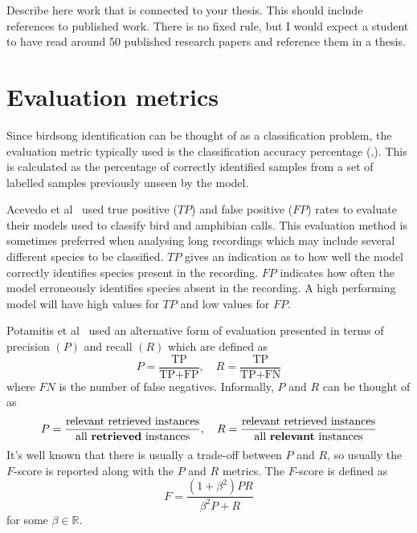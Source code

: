 Describe here work that is connected to your thesis. This should include
references to published work. There is no fixed rule, but I would expect a
student to have read around 50 published research papers and reference them in a
thesis.

\section{Evaluation metrics}

Since birdsong identification can be thought of as a classification problem, the
evaluation metric typically used is the classification accuracy percentage 
(\cite{ramashini2019bird},).
This is calculated as the percentage of correctly identified samples from a set
of labelled samples previously unseen by the model.

Acevedo et al~\cite{acevedo2009automated} used true positive ($TP$) and false
positive ($FP$) rates to evaluate their models used to classify bird and amphibian
calls. This evaluation method is sometimes preferred when analysing long
recordings which may include several different species to be classified. $TP$
gives an indication as to how well the model correctly identifies species
present in the recording. $FP$ indicates how often the model erroneously
identifies species absent in the recording. A high performing model will have
high values for $TP$ and low values for $FP$\@.

Potamitis et al~\cite{potamitis2014automatic} used an alternative form of
evaluation presented in terms of precision $(P)$ and recall $(R)$ which are
defined as
\begin{equation}
  P = \frac{\text{TP}}{\text{TP}+\text{FP}}, \hspace{1em}
  R = \frac{\text{TP}}{\text{TP}+\text{FN}}
\end{equation}
where $FN$ is the number of false negatives. Informally, $P$ and $R$ can be
thought of as
\begin{equation}
  P = \frac{\text{relevant retrieved instances}}{\text{all \textbf{retrieved} instances}}, \hspace{1em}
  R = \frac{\text{relevant retrieved instances}}{\text{all \textbf{relevant} instances}}
\end{equation}
It's well known that there is usually a trade-off between $P$ and $R$, so
usually the $F$-score is reported along with the $P$ and $R$ metrics. The
$F$-score is defined as
\begin{equation}
F = \frac{(1+\beta^2)PR}{\beta^2P + R}
\end{equation}
for some $\beta \in \mathbb{R}$.

